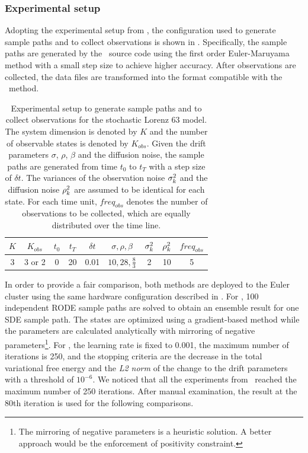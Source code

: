 \subsubsection*{Experimental setup}

Adopting the experimental setup from \cite{vrettas2015variational}, the configuration used to generate sample paths and to collect observations is shown in .
Specifically, the sample paths are generated by the \algovgpa\ source code using the first order Euler-Maruyama method with a small step size to achieve higher accuracy.
After observations are collected, the data files are transformed into the format compatible with the \algolpmfsde\ method.

\begin{table}
\centering
\caption{Experimental setup to generate sample paths and to collect observations for the stochastic Lorenz 63 model. The system dimension is denoted by $K$ and the number of observable states is denoted by $K_{obs}$. Given the drift parameters $\sigma$, $\rho$, $\beta$ and the diffusion noise, the sample paths are generated from time $t_0$ to $t_T$ with a step size of $\delta t$. The variances of the observation noise $\sigma_{k}^2$ and the diffusion noise $\rho_{k}^2$ are assumed to be identical for each state. For each time unit, $freq_{obs}$ denotes the number of observations to be collected, which are equally distributed over the time line.}
\label{table-lorenz-63-setup}
\begin{tabular}{|c|c|c|c|c|c|c|c|c|}
\hline
$K$ & $K_{obs}$ & $t_0$ & $t_T$ & $\delta t$ & $\sigma, \rho, \beta$ & $\sigma_{k}^2$  & $\rho_{k}^2$ & $freq_{obs}$ \\ \hline
3 & 3 or 2 & 0 & 20 & 0.01 & $10, 28, \frac{8}{3}$ & 2 & 10 & 5 \\ \hline
\end{tabular}
\end{table}

In order to provide a fair comparison, both methods are deployed to the Euler cluster using the same hardware configuration described in .
For \algolpmfsde, 100 independent RODE sample paths are solved to obtain an ensemble result for one SDE sample path.
The states are optimized using a gradient-based method while the parameters are calculated analytically with mirroring of negative parameters\footnote{The mirroring of negative parameters is a heuristic solution. A better approach would be the enforcement of positivity constraint.}.
For \algovgpamap, the learning rate is fixed to 0.001, the maximum number of iterations is 250, and the stopping criteria are the decrease in the total variational free energy and the \emph{L2 norm} of the change to the drift parameters with a threshold of $10^{-6}$.
We noticed that all the experiments from \algovgpamap\  reached the maximum number of 250 iterations.
After manual examination, the result at the 80th iteration is used for the following comparisons.

